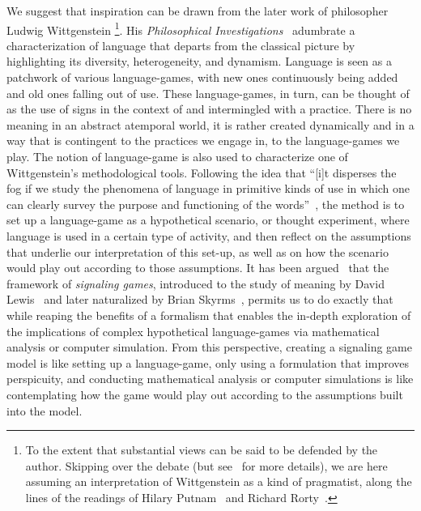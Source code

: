 \documentclass[a4paper]{article}
\begin{document}
We suggest that inspiration can be drawn from the later work of philosopher Ludwig Wittgenstein%
\footnote{To the extent that substantial views can be said to be defended by the author. Skipping over the debate (but see~\cite{kahane_wittgenstein_2007} for more details), we are here assuming an interpretation of Wittgenstein as a kind of pragmatist, along the lines of the readings of Hilary Putnam~\parencite*{putnam_pragmatism_1994} and Richard Rorty~\parencite*{rorty_wittgenstein_2007}.}.
His \emph{Philosophical Investigations}~\parencite*{wittgenstein_philosophical_1953} adumbrate a characterization of language that departs from the classical picture by highlighting its diversity, heterogeneity, and dynamism.
Language is seen as a patchwork of various language-games, with new ones continuously being added and old ones falling out of use.
These language-games, in turn, can be thought of as the use of signs in the context of and intermingled with a practice.
There is no meaning in an abstract atemporal world, it is rather created dynamically and in a way that is contingent to the practices we engage in, to the language-games we play.
The notion of language-game is also used to characterize one of Wittgenstein's methodological tools.
Following the idea that ``[i]t disperses the fog if we study the phenomena of language in primitive kinds of use in which one can clearly survey the purpose and functioning of the words''~\parencite*[\S 5]{wittgenstein_philosophical_1953}, the method is to set up a language-game as a hypothetical scenario, or thought experiment, where language is used in a certain type of activity, and then reflect on the assumptions that underlie our interpretation of this set-up, as well as on how the scenario would play out according to those assumptions.
It has been argued~\parencite{correia_bivalent_2013} that the framework of \emph{signaling games}, introduced to the study of meaning by David Lewis~\parencite*{lewis_convention_1969} and later naturalized by Brian Skyrms~\parencite*{skyrms_evolution_1996}, permits us to do exactly that while reaping the benefits of a formalism that enables the in-depth exploration of the implications of complex hypothetical language-games via mathematical analysis or computer simulation.
From this perspective, creating a signaling game model is like setting up a language-game, only using a formulation that improves perspicuity, and conducting mathematical analysis or computer simulations is like contemplating how the game would play out according to the assumptions built into the model.
\end{document}
